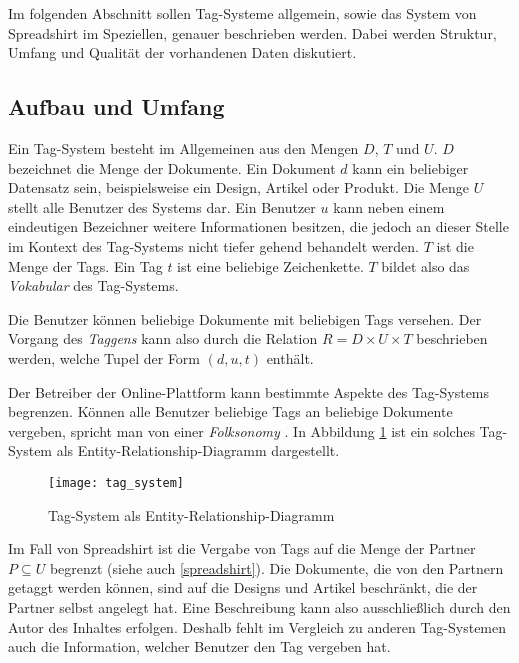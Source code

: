 Im folgenden Abschnitt sollen Tag-Systeme allgemein, sowie das System von Spreadshirt im Speziellen, genauer beschrieben werden. Dabei werden Struktur, Umfang und Qualität der vorhandenen Daten diskutiert.

\subsection{Aufbau und Umfang}
\label{tag-system}

Ein Tag-System besteht im Allgemeinen aus den Mengen \(D\), \(T\) und \(U\). \(D\) bezeichnet die Menge der Dokumente. Ein Dokument \(d\) kann ein beliebiger Datensatz sein, beispielsweise ein Design, Artikel oder Produkt. Die Menge \(U\) stellt alle Benutzer des Systems dar. Ein Benutzer \(u\) kann neben einem eindeutigen Bezeichner weitere Informationen besitzen, die jedoch an dieser Stelle im Kontext des Tag-Systems nicht tiefer gehend behandelt werden. \(T\) ist die Menge der Tags. Ein Tag \(t\) ist eine beliebige Zeichenkette. \(T\) bildet also das \emph{Vokabular} des Tag-Systems.

Die Benutzer können beliebige Dokumente mit beliebigen Tags versehen. Der Vorgang des \emph{Taggens} kann also durch die Relation \(R = D \times U \times T\) beschrieben werden, welche Tupel der Form \((d, u, t)\) enthält.

Der Betreiber der Online-Plattform kann bestimmte Aspekte des Tag-Systems begrenzen. Können alle Benutzer beliebige Tags an beliebige Dokumente vergeben, spricht man von einer \emph{Folksonomy} \cite{ip2009}. In Abbildung \ref{fig:tagsystem} ist ein solches Tag-System als Entity-Relationship-Diagramm dargestellt.

\begin{figure}
\centering
\texttt{[image: tag\_system]}
\caption{Tag-System als Entity-Relationship-Diagramm}
\label{fig:tagsystem}
\end{figure}


Im Fall von Spreadshirt ist die Vergabe von Tags auf die Menge der Partner \(P \subseteq U\) begrenzt (siehe auch \ref{spreadshirt}). Die Dokumente, die von den Partnern getaggt werden können, sind auf die Designs und Artikel beschränkt, die der Partner selbst angelegt hat. Eine Beschreibung kann also ausschließlich durch den Autor des Inhaltes erfolgen. Deshalb fehlt im Vergleich zu anderen Tag-Systemen auch die Information, welcher Benutzer den Tag vergeben hat.

\label{tag_sprd}

